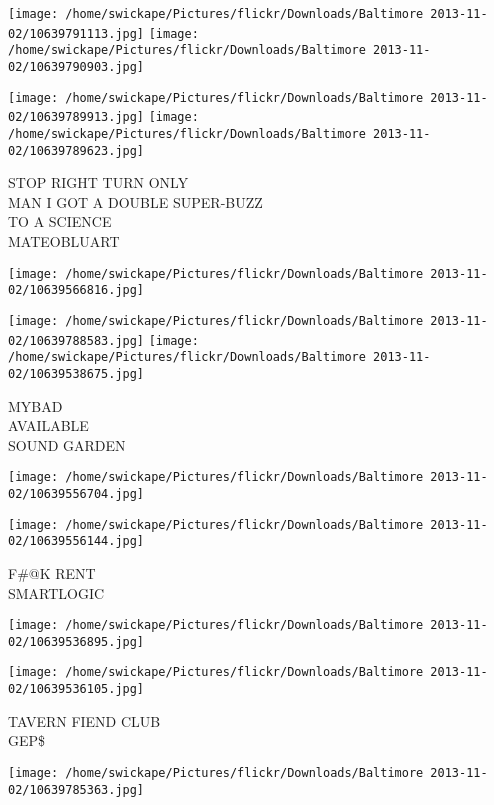 \documentclass[10pt,letterpaper]{article}
\begin{document}
\texttt{[image: /home/swickape/Pictures/flickr/Downloads/Baltimore 2013-11-02/10639791113.jpg]}
\texttt{[image: /home/swickape/Pictures/flickr/Downloads/Baltimore 2013-11-02/10639790903.jpg]}

\texttt{[image: /home/swickape/Pictures/flickr/Downloads/Baltimore 2013-11-02/10639789913.jpg]}
\texttt{[image: /home/swickape/Pictures/flickr/Downloads/Baltimore 2013-11-02/10639789623.jpg]}

STOP RIGHT TURN ONLY\\
MAN I GOT A DOUBLE SUPER{-}BUZZ\\
TO A SCIENCE\\
MATEOBLUART\\
\pagebreak

\texttt{[image: /home/swickape/Pictures/flickr/Downloads/Baltimore 2013-11-02/10639566816.jpg]}

\vspace{0.25in}
\texttt{[image: /home/swickape/Pictures/flickr/Downloads/Baltimore 2013-11-02/10639788583.jpg]}
\texttt{[image: /home/swickape/Pictures/flickr/Downloads/Baltimore 2013-11-02/10639538675.jpg]}

MYBAD\\
AVAILABLE\\
SOUND GARDEN\\
\pagebreak

\texttt{[image: /home/swickape/Pictures/flickr/Downloads/Baltimore 2013-11-02/10639556704.jpg]}

\vspace{0.25in}
\texttt{[image: /home/swickape/Pictures/flickr/Downloads/Baltimore 2013-11-02/10639556144.jpg]}

F\#@K RENT\\
SMARTLOGIC\\
\pagebreak

\texttt{[image: /home/swickape/Pictures/flickr/Downloads/Baltimore 2013-11-02/10639536895.jpg]}

\vspace{0.25in}
\texttt{[image: /home/swickape/Pictures/flickr/Downloads/Baltimore 2013-11-02/10639536105.jpg]}

TAVERN FIEND CLUB\\
GEP\$\\
\pagebreak

\texttt{[image: /home/swickape/Pictures/flickr/Downloads/Baltimore 2013-11-02/10639785363.jpg]}
\end{document}
